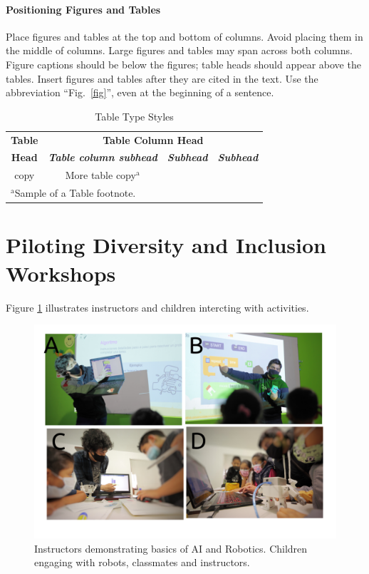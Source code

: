 \documentclass[conference]{IEEEtran}
\begin{document}
\paragraph{Positioning Figures and Tables} Place figures and tables at the top and 
bottom of columns. Avoid placing them in the middle of columns. Large 
figures and tables may span across both columns. Figure captions should be 
below the figures; table heads should appear above the tables. Insert 
figures and tables after they are cited in the text. Use the abbreviation 
``Fig.~\ref{fig}'', even at the beginning of a sentence.

\begin{table}[htbp]
\caption{Table Type Styles}
\begin{center}
\begin{tabular}{|c|c|c|c|}
\hline
\textbf{Table}&\multicolumn{3}{|c|}{\textbf{Table Column Head}} \\
\cline{2-4} 
\textbf{Head} & \textbf{\textit{Table column subhead}}& \textbf{\textit{Subhead}}& \textbf{\textit{Subhead}} \\
\hline
copy& More table copy$^{\mathrm{a}}$& &  \\
\hline
\multicolumn{4}{l}{$^{\mathrm{a}}$Sample of a Table footnote.}
\end{tabular}
\label{tab1}
\end{center}
\end{table}

\section{Piloting Diversity and Inclusion Workshops}

Figure \ref{fig:pilot} illustrates instructors and children intercting with activities. 

\lipsum[1]

\begin{figure}[htbp]
    \centerline{\includegraphics{piloting-workshops/versions/drawing-v00.png}}
    \caption{Instructors demonstrating basics of AI and Robotics. 
    Children engaging with robots, classmates and instructors.}
    \label{fig:pilot}
\end{figure}
\end{document}
